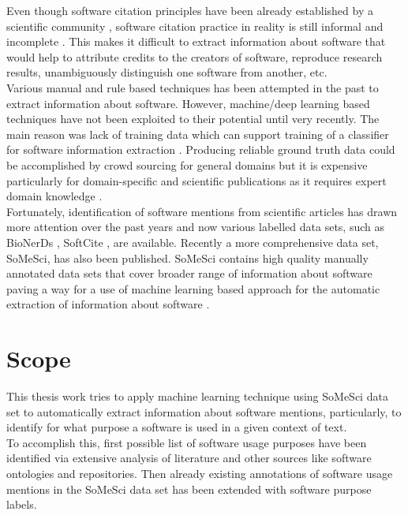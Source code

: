 Even though software citation principles have been already established by a scientific community \citep{callaghan2014joint, smith2016software}, software citation practice in reality  is still informal and incomplete \citep{schindler2021somesci}. This makes it difficult to extract information about software that would help to attribute credits to the creators of software, reproduce research results, unambiguously distinguish one software from another, etc. \\

Various manual and rule based techniques has been attempted in the past to extract information about software. However, machine/deep learning based techniques have not been exploited to their potential until very recently. The main reason was lack of training data which can support training of a classifier for software information extraction \citep{schindler2021somesci}. Producing reliable ground truth data could be accomplished by crowd sourcing for general domains but it is expensive particularly for domain-specific and scientific publications as it requires expert domain knowledge \citep{beltagy2019scibert}. \\

Fortunately, identification of software mentions from scientific articles has drawn more attention over the past years and now various labelled data sets, such as BioNerDs \citep{duck2013bionerds} , SoftCite \citep{du2021softcite}, are available. Recently a more comprehensive data set, \ac{SoMeSci}, has also been published.  \ac{SoMeSci} contains high quality manually annotated data sets that cover broader range of information about software paving a way for a use of machine learning based approach for the automatic extraction of information about software \citep{schindler2021somesci}. 


\section{Scope}
\label{sec:intro:Scope}

This thesis work tries to apply machine learning technique using \ac{SoMeSci} data set to automatically extract information about software mentions, particularly, to identify for what purpose a software is used in a given context of text. \\

To accomplish this, first possible list of software usage purposes have been identified via extensive analysis of literature and other sources like software ontologies and repositories. Then already existing annotations of software usage mentions in the \ac{SoMeSci} data set has been extended with software purpose labels. \\

